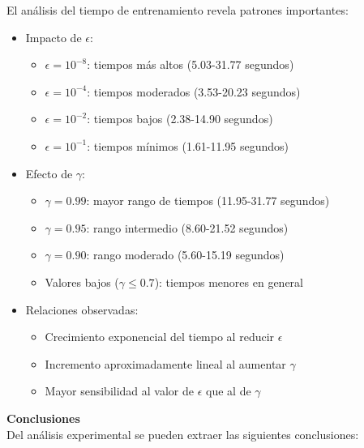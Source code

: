 El análisis del tiempo de entrenamiento revela patrones importantes:

\begin{itemize}
    \item Impacto de $\epsilon$:
    \begin{itemize}
        \item $\epsilon = 10^{-8}$: tiempos más altos (5.03-31.77 segundos)
        \item $\epsilon = 10^{-4}$: tiempos moderados (3.53-20.23 segundos)
        \item $\epsilon = 10^{-2}$: tiempos bajos (2.38-14.90 segundos)
        \item $\epsilon = 10^{-1}$: tiempos mínimos (1.61-11.95 segundos)
    \end{itemize}
    \item Efecto de $\gamma$:
    \begin{itemize}
        \item $\gamma = 0.99$: mayor rango de tiempos (11.95-31.77 segundos)
        \item $\gamma = 0.95$: rango intermedio (8.60-21.52 segundos)
        \item $\gamma = 0.90$: rango moderado (5.60-15.19 segundos)
        \item Valores bajos ($\gamma \leq 0.7$): tiempos menores en general
    \end{itemize}
    \item Relaciones observadas:
    \begin{itemize}
        \item Crecimiento exponencial del tiempo al reducir $\epsilon$
        \item Incremento aproximadamente lineal al aumentar $\gamma$
        \item Mayor sensibilidad al valor de $\epsilon$ que al de $\gamma$
    \end{itemize}
\end{itemize}

\textbf{Conclusiones}
\\

Del análisis experimental se pueden extraer las siguientes conclusiones:

